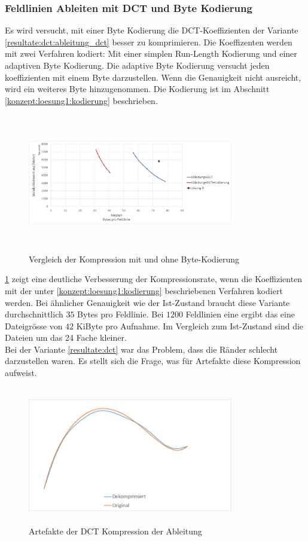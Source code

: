 \subsubsection{Feldlinien Ableiten mit DCT und Byte Kodierung}
Es wird versucht, mit einer Byte Kodierung die DCT-Koeffizienten der Variante \ref{resultate:dct:ableitung_dct} besser zu komprimieren. Die Koeffizenten werden mit zwei Verfahren kodiert: Mit einer simplen Run-Length Kodierung und einer adaptiven Byte Kodierung. Die adaptive Byte Kodierung versucht jeden koeffizienten mit einem Byte darzustellen. Wenn die Genauigkeit nicht ausreicht, wird ein weiteres Byte hinzugenommen. Die Kodierung ist im Abschnitt \ref{konzept:loesung1:kodierung} beschrieben.
\begin{figure}[!htbp]
	\center
	\includegraphics[width=0.8\textwidth,height=6cm,keepaspectratio]{./pictures/resultate/loesung1/loesung1-6/loesung1_6.png}
	\caption{Vergleich der Kompression mit und ohne Byte-Kodierung}
	\label{resultate:loesung1:dct:kodierung}
\end{figure}
\ref{resultate:loesung1:dct:kodierung} zeigt eine deutliche Verbesserung der Kompressionsrate, wenn die Koeffizienten mit der unter \ref{konzept:loesung1:kodierung} beschriebenen Verfahren kodiert werden. Bei ähnlicher Genauigkeit wie der Ist-Zustand braucht diese Variante durchschnittlich $35$ Bytes pro Feldlinie. Bei $1200$ Feldlinien eine ergibt das eine Dateigrösse von $42$ KiByte pro Aufnahme. Im Vergleich zum Ist-Zustand sind die Dateien um das 24 Fache kleiner.\\
[\baselineskip]
Bei der Variante \ref{resultate:dct} war das Problem, dass die Ränder schlecht darzustellen waren. Es stellt sich die Frage, was für Artefakte diese Kompression aufweist.
\begin{figure}[!htbp]
	\center
	\includegraphics[width=0.8\textwidth,height=6cm,keepaspectratio]{./pictures/resultate/loesung1/loesung1-6/artefakte.png}
	\caption{Artefakte der DCT Kompression der Ableitung}
	\label{resultate:loesung1:dct:byte:artefakte}
\end{figure} 
